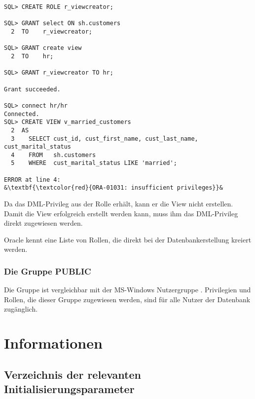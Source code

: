           \begin{lstlisting}[caption={Erstellen der View \identifier{v\_married\_customers}},label=admin251,language=oracle_sql,alsolanguage=sqlplus]
SQL> CREATE ROLE r_viewcreator;

SQL> GRANT select ON sh.customers
  2  TO    r_viewcreator;

SQL> GRANT create view
  2  TO    hr;

SQL> GRANT r_viewcreator TO hr;

Grant succeeded.

SQL> connect hr/hr
Connected.
SQL> CREATE VIEW v_married_customers
  2  AS
  3    SELECT cust_id, cust_first_name, cust_last_name, cust_marital_status
  4    FROM   sh.customers
  5    WHERE  cust_marital_status LIKE 'married';

ERROR at line 4:
&\textbf{\textcolor{red}{ORA-01031: insufficient privileges}}&

          \end{lstlisting}
          Da  das DML-Privileg aus der Rolle  erh\"alt, kann er die View nicht erstellen. Damit die View erfolgreich erstellt werden kann, muss ihm das DML-Privileg direkt zugewiesen werden.
          \begin{merke}
            Oracle kennt eine Liste von Rollen, die direkt bei der Datenbankerstellung kreiert werden.
          \end{merke}
        \subsubsection{Die Gruppe PUBLIC}
          Die Gruppe  ist vergleichbar mit der MS-Windows Nutzergruppe . Privilegien und Rollen, die dieser Gruppe zugewiesen werden, sind f\"ur alle Nutzer der Datenbank zug\"anglich.
\clearpage
    \section{Informationen}
      \subsection{Verzeichnis der relevanten Initialisierungsparameter}
        \begin{literaturinternet}
          \item \cite{REFRN10133}
          \item \cite{REFRN10184}
        \end{literaturinternet}
